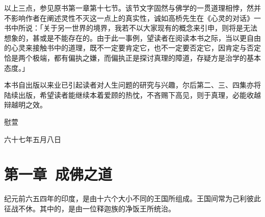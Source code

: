 \documentclass[12pt,twoside,openany]{book}
\begin{document}
以上三点，参见原书第一章第十七节。该节文字固然与佛学的一贯道理相悖，然并不影响作者在阐述灵性不灭这一点上的真实性，诚如高桥先生在《心灵的对话》一书中所说：「关于另一世界的境界，我若不以大家现有的概念来引申，则将是无法想象的，甚或是不能存在的。由于此一事例，望读者在阅读本书之际，当以更自由的心灵来接触书中的道理，既不一定要肯定它，也不一定要否定它，因肯定与否定恰是两个极端，都有偏执之嫌，而偏执正是探讨真理的障道，存疑方是治学的基本态度。」

本书自出版以来业已引起读者对人生问题的研究与兴趣，尔后第二、三、四集亦将陆续出版，希望读者能继续本着爱顾的热忱，不吝赐下高见，则于真理，必能收越辩越明之效。

\begin{flushright}
慰萱\hspace{1.5cm}

六十七年五月八日	
\end{flushright}






%
%
%
%
%
%
%
%
%
%
%
%
%
%
%
%
%
%
%
%
%
%
%
%
%
%
%
%
%
%
%
%
%
%
%
%
%
%
%
%
%
%
%
%
%
%
%
%







\chapter{第一章\ 成佛之道}\label{ch1}
纪元前六五四年的印度，是由十六个大小不同的王国所组成。王国间常为己利彼此征战不休。其中的，是由一位释迦族的净饭王所统治。
\end{document}
